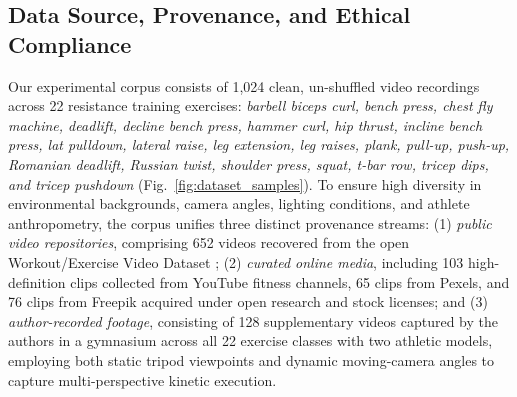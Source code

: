 \documentclass[runningheads]{llncs}
\begin{document}
\subsection{Data Source, Provenance, and Ethical Compliance}
Our experimental corpus consists of 1,024 clean, un-shuffled video recordings across 22 resistance training exercises: \textit{barbell biceps curl, bench press, chest fly machine, deadlift, decline bench press, hammer curl, hip thrust, incline bench press, lat pulldown, lateral raise, leg extension, leg raises, plank, pull-up, push-up, Romanian deadlift, Russian twist, shoulder press, squat, t-bar row, tricep dips, and tricep pushdown} (Fig.~\ref{fig:dataset_samples}). To ensure high diversity in environmental backgrounds, camera angles, lighting conditions, and athlete anthropometry, the corpus unifies three distinct provenance streams: (1) \textit{public video repositories}, comprising 652 videos recovered from the open Workout/Exercise Video Dataset \cite{abdillah2023}; (2) \textit{curated online media}, including 103 high-definition clips collected from YouTube fitness channels, 65 clips from Pexels, and 76 clips from Freepik acquired under open research and stock licenses; and (3) \textit{author-recorded footage}, consisting of 128 supplementary videos captured by the authors in a gymnasium across all 22 exercise classes with two athletic models, employing both static tripod viewpoints and dynamic moving-camera angles to capture multi-perspective kinetic execution.
\end{document}
